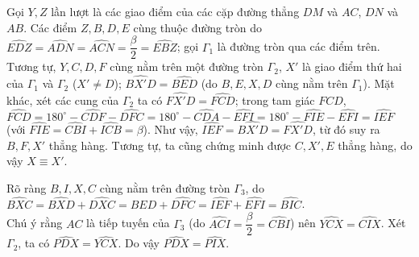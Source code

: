\begin{ex}
{\begin{nx}
	Gọi $Y,Z$ lần lượt là các giao điểm của các cặp đường thẳng $DM$ và $AC$, $DN$ và $AB$. Các điểm $Z,B,D,E$ cùng thuộc đường tròn do $\widehat{EDZ}=\widehat{ADN}=\widehat{ACN}=\dfrac{\beta}{2}=\widehat{EBZ}$; gọi $\Gamma_1$ là đường tròn qua các điểm trên. Tương tự, $Y,C,D,F$ cùng nằm trên một đường tròn $\Gamma_2$, $X'$ là giao điểm thứ hai của $\Gamma_1$ và $\Gamma_2$ ($X'\neq D$); $\widehat{BX'D}=\widehat{BED}$ (do $B,E,X,D$ cùng nằm trên $\Gamma_1$). Mặt khác, xét các cung của $\Gamma_2$ ta có $\widehat{FX'D}=\widehat{FCD}$; trong tam giác $FCD$, $\widehat{FCD}=180^\circ-\widehat{CDF}-\widehat{DFC}=180^\circ-\widehat{CDA}-\widehat{EFI}=180^\circ-\widehat{FIE}-\widehat{EFI}=\widehat{IEF}$ (với $\widehat{FIE}=\widehat{CBI}+\widehat{ICB}=\beta$). Như vậy, $\widehat{IEF}=\widehat{BX'D}=\widehat{FX'D}$, từ đó suy ra $B,F,X'$ thẳng hàng. Tương tự, ta cũng chứng minh được $C,X',E$ thẳng hàng, do vậy $X\equiv X'$.
	
	Rõ ràng $B,I,X,C$ cùng nằm trên đường tròn $\Gamma_3$, do $\widehat{BXC}=\widehat{BXD}+\widehat{DXC}=\widehat{BED}+\widehat{DFC}=\widehat{IEF}+\widehat{EFI}=\widehat{BIC}$.\\
	Chú ý rằng $AC$ là tiếp tuyến của $\Gamma_3$ (do $\widehat{ACI}=\dfrac{\beta}{2}=\widehat{CBI}$) nên $\widehat{YCX}=\widehat{CIX}$. Xét $\Gamma_2$, ta có $\widehat{PDX}=\widehat{YCX}$. Do vậy $\widehat{PDX}=\widehat{PIX}$.
	\begin{center}
\end{center}
\end{nx}
}
\end{ex}
